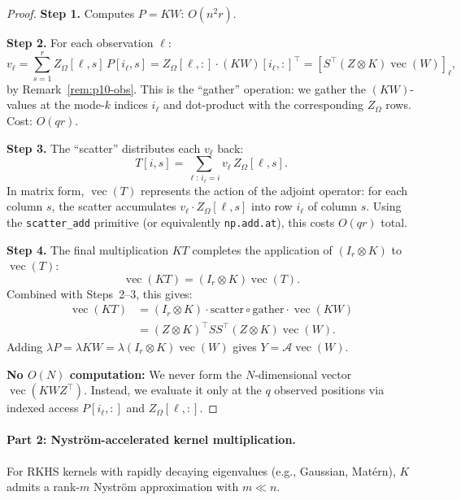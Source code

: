 \begin{proof}
\textbf{Step 1.} Computes $P = KW$: $O(n^2 r)$.

\textbf{Step 2.} For each observation $\ell$:
\[
  v_\ell = \sum_{s=1}^r Z_\Omega[\ell, s]\,P[i_\ell, s]
  = Z_\Omega[\ell,:]\cdot (KW)[i_\ell,:]^\top
  = [S^\top(Z \otimes K)\operatorname{vec}(W)]_\ell,
\]
by Remark~\ref{rem:p10-obs}. This is the ``gather'' operation: we gather the
$(KW)$-values at the mode-$k$ indices $i_\ell$ and dot-product with the
corresponding $Z_\Omega$ rows. Cost: $O(qr)$.

\textbf{Step 3.} The ``scatter'' distributes each $v_\ell$ back:
\[
  T[i, s] = \sum_{\ell:\,i_\ell = i} v_\ell\,Z_\Omega[\ell, s].
\]
In matrix form, $\operatorname{vec}(T)$ represents the action of the adjoint
operator: for each column $s$, the scatter accumulates
$v_\ell \cdot Z_\Omega[\ell,s]$ into row $i_\ell$ of column $s$.
Using the \texttt{scatter\_add} primitive (or equivalently \texttt{np.add.at}),
this costs $O(qr)$ total.

\textbf{Step 4.} The final multiplication $KT$ completes the application of
$(I_r \otimes K)$ to $\operatorname{vec}(T)$:
\[
  \operatorname{vec}(KT) = (I_r \otimes K)\operatorname{vec}(T).
\]
Combined with Steps~2--3, this gives:
\begin{align*}
  \operatorname{vec}(KT) &= (I_r \otimes K)\cdot\text{scatter}\circ\text{gather}\cdot\operatorname{vec}(KW)\\
  &= (Z \otimes K)^\top SS^\top(Z \otimes K)\operatorname{vec}(W).
\end{align*}
Adding $\lambda P = \lambda KW = \lambda(I_r \otimes K)\operatorname{vec}(W)$
gives $Y = \mathcal{A}\operatorname{vec}(W)$.

\textbf{No $O(N)$ computation:} We never form the $N$-dimensional vector
$\operatorname{vec}(KWZ^\top)$. Instead, we evaluate it only at the $q$
observed positions via indexed access $P[i_\ell,:]$ and $Z_\Omega[\ell,:]$.
\end{proof}

\paragraph{Part 2: Nystr\"om-accelerated kernel multiplication.}

For RKHS kernels with rapidly decaying eigenvalues (e.g., Gaussian, Mat\'ern),
$K$ admits a rank-$m$ Nystr\"om approximation with $m \ll n$.

